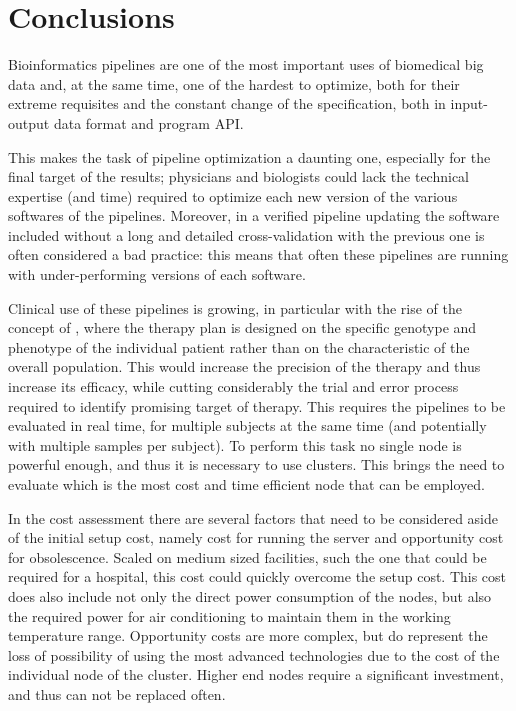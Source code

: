 \documentclass{standalone}
\begin{document}
\section*{Conclusions}

Bioinformatics pipelines are one of the most important uses of biomedical big data and, at the same time, one of the hardest to optimize, both for their extreme requisites and the constant change of the specification, both in input-output data format and program API.

This makes the task of pipeline optimization a daunting one, especially for the final target of the results; physicians and biologists could lack the technical expertise (and time) required to optimize each new version of the various softwares of the pipelines.
Moreover, in a verified pipeline updating the software included without a long and detailed cross-validation with the previous one is often considered a bad practice: this means that often these pipelines are running with under-performing versions of each software.

Clinical use of these pipelines is growing, in particular with the rise of the concept of , where the therapy plan is designed on the specific genotype and phenotype of the individual patient rather than on the characteristic of the overall population.
This would increase the precision of the therapy and thus increase its efficacy, while cutting considerably the trial and error process required to identify promising target of therapy.
This requires the pipelines to be evaluated in real time, for multiple subjects at the same time (and potentially with multiple samples per subject).
To perform this task no single node is powerful enough, and thus it is necessary to use clusters.
This brings the need to evaluate which is the most cost and time efficient node that can be employed.

In the cost assessment there are several factors that need to be considered aside of the initial setup cost, namely cost for running the server and opportunity cost for obsolescence.
Scaled on medium sized facilities, such the one that could be required for a hospital, this cost could quickly overcome the setup cost.
This cost does also include not only the direct power consumption of the nodes, but also the required power for air conditioning to maintain them in the working temperature range.
Opportunity costs are more complex, but do represent the loss of possibility of using the most advanced technologies due to the cost of the individual node of the cluster.
Higher end nodes require a significant investment, and thus can not be replaced often.
\end{document}
